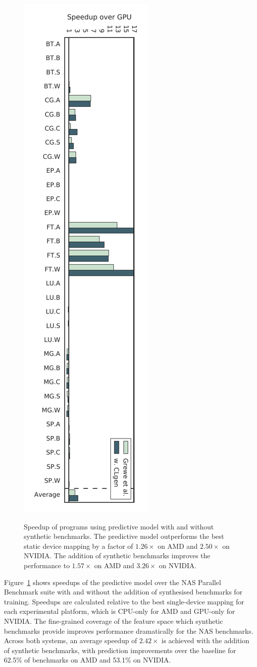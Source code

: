 \begin{figure}
{    \includegraphics[width=.32\textwidth,angle=0]{img/ex1-B}%
    \label{fig:npb-nvidia}}%
  \caption[Speedup of predictions with and without synthetic benchmarks]{%
    Speedup of programs using \citeauthor{Grewe2013} predictive model with and without synthetic benchmarks. The predictive model outperforms the best static device mapping by a factor of $1.26\times$ on AMD and $2.50\times$ on NVIDIA. The addition of synthetic benchmarks improves the performance to $1.57\times$ on AMD and $3.26\times$ on NVIDIA.%
  }%
  \label{fig:npb} %
\end{figure}

Figure~\ref{fig:npb} shows speedups of the \citeauthor{Grewe2013} predictive model over the NAS Parallel Benchmark suite with and without the addition of synthesised benchmarks for training. Speedups are calculated relative to the best single-device mapping for each experimental platform, which is CPU-only for AMD and GPU-only for NVIDIA. The fine-grained coverage of the feature space which synthetic benchmarks provide improves performance dramatically for the NAS benchmarks. Across both systems, an average speedup of $2.42\times$ is achieved with the addition of synthetic benchmarks, with prediction improvements over the baseline for 62.5\% of benchmarks on AMD and 53.1\% on NVIDIA.

